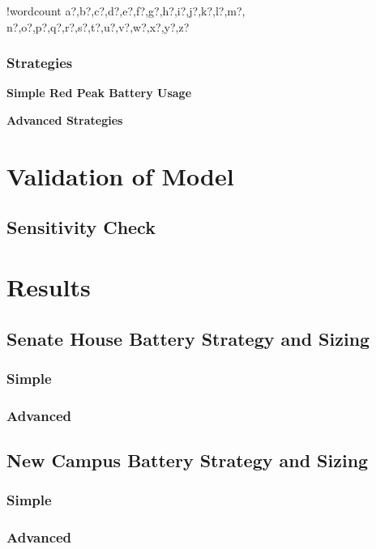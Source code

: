 \documentclass[fontsize=9.5pt]{extarticle}
\newcounter{words}
\newenvironment{counted}{%
  \setcounter{words}{0}
  \SearchList!{wordcount}{\stepcounter{words}}
    {a?,b?,c?,d?,e?,f?,g?,h?,i?,j?,k?,l?,m?,
    n?,o?,p?,q?,r?,s?,t?,u?,v?,w?,x?,y?,z?}
  \UndoBoundary{'}
  \SearchOrder{p;}}{%
  \StopSearching}
\begin{document}
\begin{counted}
\subsubsection{Strategies}\label{strategies}

\textbf{Simple Red Peak Battery Usage}

\textbf{Advanced Strategies}

\section{Validation of Model}\label{validation-of-model}

\subsection{Sensitivity Check}\label{sensitivity-check}

\section{Results}\label{results}

\subsection{Senate House Battery Strategy and
Sizing}\label{senate-house-battery-strategy-and-sizing}

\subsubsection{Simple}\label{simple}

\subsubsection{Advanced}\label{advanced}

\subsection{New Campus Battery Strategy and
Sizing}\label{new-campus-battery-strategy-and-sizing}

\subsubsection{Simple}\label{simple-1}

\subsubsection{Advanced}\label{advanced-1}


\end{counted}
\end{document}
